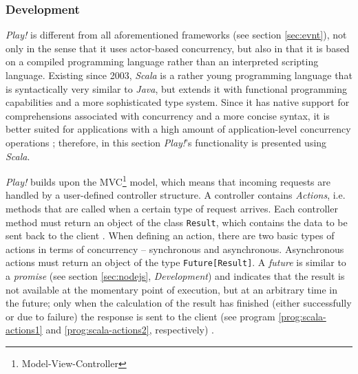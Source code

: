 \subsubsection*{Development}
\textit{Play!} is different from all aforementioned frameworks (see section \ref{sec:evnt}), not only in the sense that it uses actor-based concurrency, but also in that it is based on a compiled programming language rather than an interpreted scripting language. Existing since 2003, \textit{Scala} is a rather young programming language that is syntactically very similar to \textit{Java}, but extends it with functional programming capabilities and a more sophisticated type system. Since it has native support for comprehensions associated with concurrency and a more concise syntax, it is better suited for applications with a high amount of application-level concurrency operations \cite[p. 9]{Scala}; therefore, in this section \textit{Play!}'s functionality is presented using \textit{Scala}.

\textit{Play!} builds upon the MVC\footnote{Model-View-Controller} model, which means that incoming requests are handled by a user-defined controller structure. A controller contains \textit{Actions}, i.e. methods that are called when a certain type of request arrives. Each controller method must return an object of the class \texttt{Result}, which contains the data to be sent back to the client \cite[p. 27]{Reelsen2011}. When defining an action, there are two basic types of actions in terms of concurrency -- synchronous and asynchronous. Asynchronous actions must return an object of the type \texttt{Future[Result]}. A \textit{future} is similar to a \textit{promise} (see section \ref{sec:nodejs}, \textit{Development}) and indicates that the result is not available at the momentary point of execution, but at an arbitrary time in the future; only when the calculation of the result has finished (either successfully or due to failure) the response is sent to the client (see program \ref{prog:scala-actions1} and \ref{prog:scala-actions2}, respectively) \cite[p. 86]{Scala}. 

